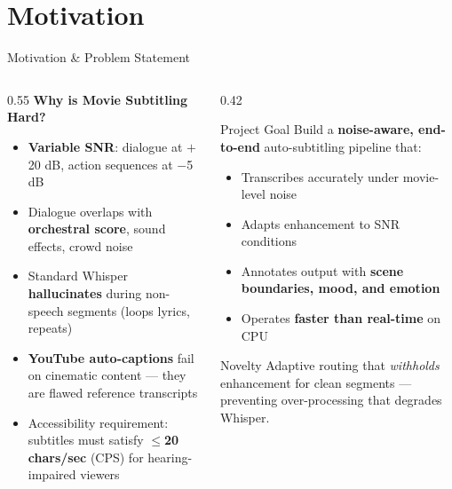 \documentclass[aspectratio=169]{beamer}
\begin{document}
\section{Motivation}
\begin{frame}{Motivation \& Problem Statement}
  \begin{columns}[T]
    \begin{column}{0.55\textwidth}
      \textbf{Why is Movie Subtitling Hard?}
      \begin{itemize}
        \item \textbf{Variable SNR}: dialogue at $+$20 dB, action sequences at $-$5 dB
        \item Dialogue overlaps with \textbf{orchestral score}, sound effects, crowd noise
        \item Standard Whisper \textbf{hallucinates} during non-speech segments (loops lyrics, repeats)
        \item \textbf{YouTube auto-captions} fail on cinematic content — they are flawed reference transcripts
        \item Accessibility requirement: subtitles must satisfy \textbf{$\leq$20 chars/sec} (CPS) for hearing-impaired viewers
      \end{itemize}
    \end{column}
    \begin{column}{0.42\textwidth}
      \begin{block}{Project Goal}
        Build a \textbf{noise-aware, end-to-end} auto-subtitling pipeline that:
        \begin{itemize}
          \item Transcribes accurately under movie-level noise
          \item Adapts enhancement to SNR conditions
          \item Annotates output with \textbf{scene boundaries, mood, and emotion}
          \item Operates \textbf{faster than real-time} on CPU
        \end{itemize}
      \end{block}
      \begin{alertblock}{Novelty}
        Adaptive routing that \emph{withholds} enhancement for clean segments — preventing over-processing that degrades Whisper.
      \end{alertblock}
    \end{column}
  \end{columns}
\end{frame}
\end{document}
